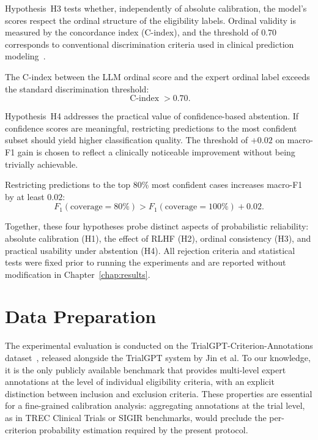 Hypothesis~H3 tests whether, independently of absolute calibration, the 
model's scores respect the ordinal structure of the eligibility labels. 
Ordinal validity is measured by the concordance index (C-index), and the 
threshold of $0.70$ corresponds to conventional discrimination criteria used 
in clinical prediction modeling~\cite{vancalster2019calibration}.

\begin{hypothesis}
    The C-index between the LLM ordinal score and the expert ordinal label 
    exceeds the standard discrimination threshold:
    \[
        \operatorname{C-index} > 0.70.
    \]
\end{hypothesis}

Hypothesis~H4 addresses the practical value of confidence-based abstention. 
If confidence scores are meaningful, restricting predictions to the most 
confident subset should yield higher classification quality. The threshold 
of $+0.02$ on macro-F1 gain is chosen to reflect a clinically noticeable 
improvement without being trivially achievable.

\begin{hypothesis}
    Restricting predictions to the top 80\% most confident cases increases 
    macro-F1 by at least $0.02$:
    \[
        F_1(\text{coverage}=80\%) > F_1(\text{coverage}=100\%) + 0.02.
    \]
\end{hypothesis}

Together, these four hypotheses probe distinct aspects of probabilistic 
reliability: absolute calibration (H1), the effect of RLHF (H2), ordinal 
consistency (H3), and practical usability under abstention (H4). All 
rejection criteria and statistical tests were fixed prior to running the 
experiments and are reported without modification in Chapter~\ref{chap:results}.

\section{Data Preparation}
\label{sec:met-data}

The experimental evaluation is conducted on the TrialGPT-Criterion-Annotations 
dataset~\cite{jin2024trialgpt}, released alongside the TrialGPT system by 
Jin et al. To our knowledge, it is the only publicly available benchmark that 
provides multi-level expert annotations at the level of individual eligibility 
criteria, with an explicit distinction between inclusion and exclusion 
criteria. These properties are essential for a fine-grained calibration 
analysis: aggregating annotations at the trial level, as in TREC Clinical 
Trials or SIGIR benchmarks, would preclude the per-criterion probability 
estimation required by the present protocol.

